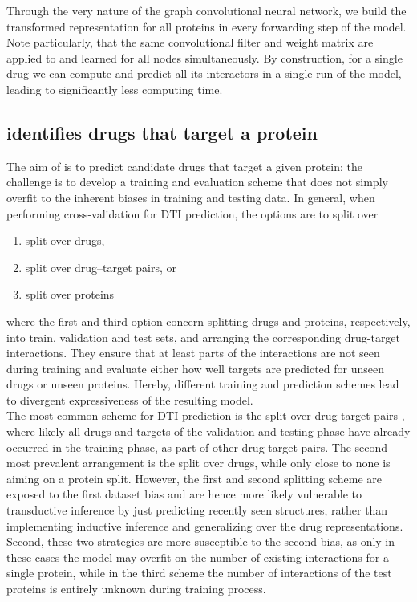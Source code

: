 \documentclass{bioinfo}
\begin{document}
Through the very nature of the graph convolutional neural network, we build the transformed representation for all proteins in every forwarding step of the model. Note particularly, that the same convolutional filter and weight matrix are applied to and learned for all nodes simultaneously. By construction, for a single drug we can compute and predict all its interactors in a single run of the model, leading to significantly less computing time. 



\subsection{\name identifies drugs that target a protein}

The aim of \name is to predict candidate drugs that target a given
protein; the challenge is to develop a training and evaluation scheme
that does not simply overfit to the inherent biases in training and
testing data.
In general, when performing cross-validation for DTI prediction, the
options are to split over 
\begin{enumerate}
	\item split over drugs,
	\item split over drug--target pairs, or
	\item split over proteins
\end{enumerate}
where the first and third option concern splitting drugs and proteins, respectively, into train, validation and test sets, and arranging the corresponding drug-target interactions. They ensure that at least parts of the interactions are not seen during training and evaluate either how well targets are predicted for unseen drugs or unseen proteins. Hereby, different training and prediction schemes lead to divergent expressiveness of the resulting model. \\

The most common scheme for DTI prediction is the split over drug-target pairs \citep{Survey2018}, where likely all drugs and targets of the validation and testing phase have already occurred in the training phase, as part of other drug-target pairs. The second most prevalent arrangement is the split over drugs, while only close to none is aiming on a protein split.  However, the first and second splitting scheme are exposed to the first dataset bias and are hence more likely vulnerable to transductive inference by just predicting recently seen structures, rather than implementing inductive inference and generalizing over the drug representations. Second, these two strategies are more susceptible to the second bias, as only in these cases the model may overfit on the number of existing interactions for a single protein, while in the third scheme the number of interactions of the test proteins is entirely unknown during training process. 
\end{document}
